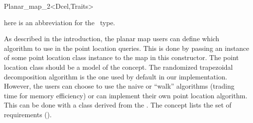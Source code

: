 \begin{ccRefClass}{Planar_map_2<Dcel,Traits>}
    
     here is an abbreviation for the \ccRefName\ type.

        



\begin{ccAdvanced}


As described in the introduction, the planar map users can define
which algorithm to use in the point location queries.  This is done
by passing an instance of some point location class instance to the map in
this constructor. The point location class should be a model of the
 concept. The randomized trapezoidal
decomposition algorithm is the one used by default in our
implementation.  However, the users can choose to use the naive or
``walk'' algorithms (trading time for memory efficiency) or can
implement their own point location algorithm. This can be done with a
class derived from the . The concept  lists the set of requirements 
().

  

\end{ccAdvanced}
\end{ccRefClass}
